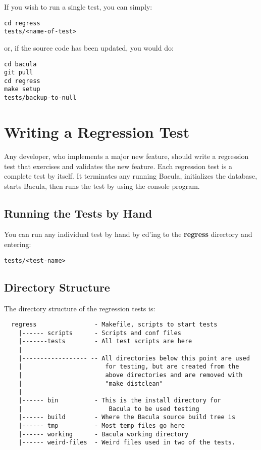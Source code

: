 If you wish to run a single test, you can simply:

\begin{verbatim}
cd regress
tests/<name-of-test>
\end{verbatim}

or, if the source code has been updated, you would do:

\begin{verbatim}
cd bacula
git pull
cd regress
make setup
tests/backup-to-null
\end{verbatim}


\section{Writing a Regression Test}

Any developer, who implements a major new feature, should write a regression
test that exercises and validates the new feature. Each regression test is a
complete test by itself. It terminates any running Bacula, initializes the
database, starts Bacula, then runs the test by using the console program. 

\subsection{Running the Tests by Hand}

You can run any individual test by hand by cd'ing to the {\bf regress}
directory and entering: 

\footnotesize
\begin{verbatim}
tests/<test-name>
\end{verbatim}
\normalsize

\subsection{Directory Structure}

The directory structure of the regression tests is: 

\footnotesize
\begin{verbatim}
  regress                - Makefile, scripts to start tests
    |------ scripts      - Scripts and conf files
    |-------tests        - All test scripts are here
    |
    |------------------ -- All directories below this point are used
    |                       for testing, but are created from the
    |                       above directories and are removed with
    |                       "make distclean"
    |
    |------ bin          - This is the install directory for
    |                        Bacula to be used testing
    |------ build        - Where the Bacula source build tree is
    |------ tmp          - Most temp files go here
    |------ working      - Bacula working directory
    |------ weird-files  - Weird files used in two of the tests.
\end{verbatim}
\normalsize

